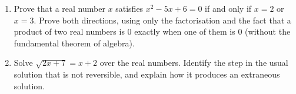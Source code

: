 \begin{enumerate}
\item[(a)] Prove that a real number $x$ satisfies $x^2-5x+6=0$ if and only if $x=2$ or $x=3$. Prove both directions, using only the factorisation and the fact that a product of two real numbers is $0$ exactly when one of them is $0$ (without the fundamental theorem of algebra).
\item[(b)] Solve $\sqrt{2x+7}=x+2$ over the real numbers. Identify the step in the usual solution that is not reversible, and explain how it produces an extraneous solution.
\end{enumerate}
